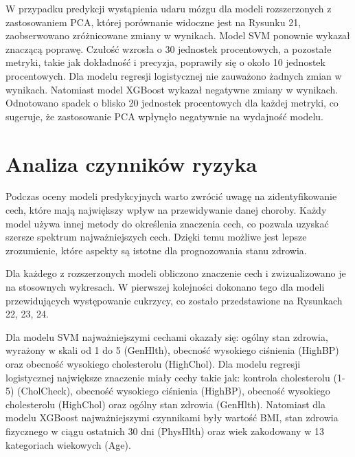 \documentclass[onecolumn,12pt]{article}
\begin{document}
\noindent
W przypadku predykcji wystąpienia udaru mózgu dla modeli rozszerzonych z zastosowaniem PCA, której porównanie widoczne jest na Rysunku 21, zaobserwowano zróżnicowane zmiany w wynikach. Model SVM ponownie wykazał znaczącą poprawę. Czułość wzrosła o 30 jednostek procentowych, a pozostałe metryki, takie jak dokładność i precyzja, poprawiły się o około 10 jednostek procentowych. Dla modelu regresji logistycznej nie zauważono żadnych zmian w wynikach. Natomiast model XGBoost wykazał negatywne zmiany w wynikach. Odnotowano spadek o blisko 20 jednostek procentowych dla każdej metryki, co sugeruje, że zastosowanie PCA wpłynęło negatywnie na wydajność modelu.

\section{Analiza czynników ryzyka}
\noindent
Podczas oceny modeli predykcyjnych warto zwrócić uwagę na zidentyfikowanie cech, które mają największy wpływ na przewidywanie danej choroby. Każdy model używa innej metody do określenia znaczenia cech, co pozwala uzyskać szersze spektrum najważniejszych cech. Dzięki temu możliwe jest lepsze zrozumienie, które aspekty są istotne dla prognozowania stanu zdrowia.

\vspace{8pt}
\noindent
Dla każdego z rozszerzonych modeli obliczono znaczenie cech i zwizualizowano je na stosownych wykresach. W pierwszej kolejności dokonano tego dla modeli przewidujących występowanie cukrzycy, co zostało przedstawione na Rysunkach 22, 23, 24.

\vspace{8pt}
\noindent
Dla modelu SVM najważniejszymi cechami okazały się: ogólny stan zdrowia, wyrażony w skali od 1 do 5 (GenHlth), obecność wysokiego ciśnienia (HighBP) oraz obecność wysokiego cholesterolu (HighChol). Dla modelu regresji logistycznej największe znaczenie miały cechy takie jak: kontrola cholesterolu (1-5) (CholCheck), obecność wysokiego ciśnienia (HighBP), obecność wysokiego cholesterolu (HighChol) oraz ogólny stan zdrowia (GenHlth). Natomiast dla modelu XGBoost najważniejszymi czynnikami były wartość BMI, stan zdrowia fizycznego w ciągu ostatnich 30 dni (PhysHlth) oraz wiek zakodowany w 13 kategoriach wiekowych (Age).
\end{document}
